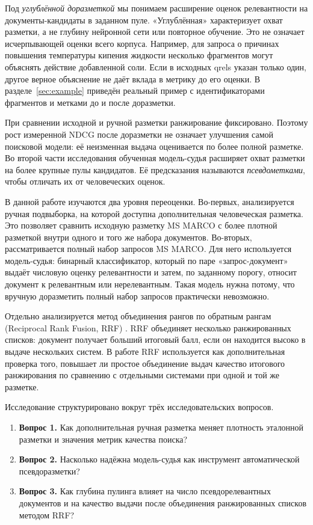 \documentclass[runningheads,a4paper]{llncs}
\begin{document}
Под \emph{углублённой доразметкой} мы понимаем расширение оценок релевантности на документы-кандидаты в заданном пуле. «Углублённая» характеризует охват разметки, а не глубину нейронной сети или повторное обучение. Это не означает исчерпывающей оценки всего корпуса. Например, для запроса о причинах повышения температуры кипения жидкости несколько фрагментов могут объяснять действие добавленной соли. Если в исходных qrels указан только один, другое верное объяснение не даёт вклада в метрику до его оценки. В разделе~\ref{sec:example} приведён реальный пример с идентификаторами фрагментов и метками до и после доразметки.

При сравнении исходной и ручной разметки ранжирование фиксировано. Поэтому рост измеренной NDCG после доразметки не означает улучшения самой поисковой модели: её неизменная выдача оценивается по более полной разметке. Во второй части исследования обученная модель-судья расширяет охват разметки на более крупные пулы кандидатов. Её предсказания называются \emph{псевдометками}, чтобы отличать их от человеческих оценок.

В данной работе изучаются два уровня переоценки. Во-первых, анализируется ручная подвыборка, на которой доступна дополнительная человеческая разметка. Это позволяет сравнить исходную разметку MS MARCO с более плотной разметкой внутри одного и того же набора документов. Во-вторых, рассматривается полный набор запросов MS MARCO. Для него используется модель-судья: бинарный классификатор, который по паре «запрос-документ» выдаёт числовую оценку релевантности и затем, по заданному порогу, относит документ к релевантным или нерелевантным. Такая модель нужна потому, что вручную доразметить полный набор запросов практически невозможно.

Отдельно анализируется метод объединения рангов по обратным рангам (Reciprocal Rank Fusion, RRF) \cite{cormack2009rrf}. RRF объединяет несколько ранжированных списков: документ получает больший итоговый балл, если он находится высоко в выдаче нескольких систем. В работе RRF используется как дополнительная проверка того, повышает ли простое объединение выдач качество итогового ранжирования по сравнению с отдельными системами при одной и той же разметке.

Исследование структурировано вокруг трёх исследовательских вопросов.
\begin{enumerate}
\item \textbf{Вопрос 1.} Как дополнительная ручная разметка меняет плотность эталонной разметки и значения метрик качества поиска?
\item \textbf{Вопрос 2.} Насколько надёжна модель-судья как инструмент автоматической псевдоразметки?
\item \textbf{Вопрос 3.} Как глубина пулинга влияет на число псевдорелевантных документов и на качество выдачи после объединения ранжированных списков методом RRF?
\end{enumerate}
\end{document}
